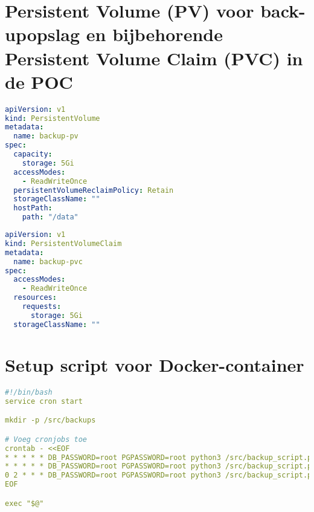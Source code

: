 \chapter{Persistent Volume (PV) voor back-upopslag en bijbehorende Persistent Volume Claim (PVC) in de POC}
\label{sec:pv}
\begin{lstlisting}[language=YAML, caption={YAML-bestand voor de configuratie van het Persistent Volume (PV) dat opslag biedt voor de databaseback-ups in Kubernetes.}]
apiVersion: v1
kind: PersistentVolume
metadata:
  name: backup-pv
spec:
  capacity:
    storage: 5Gi
  accessModes:
    - ReadWriteOnce
  persistentVolumeReclaimPolicy: Retain
  storageClassName: ""  
  hostPath:
    path: "/data"  

\end{lstlisting}

\begin{lstlisting}[language=YAML, caption={YAML-bestand voor de configuratie van de Persistent Volume Claim (PVC).}]
apiVersion: v1
kind: PersistentVolumeClaim
metadata:
  name: backup-pvc
spec:
  accessModes:
    - ReadWriteOnce
  resources:
    requests:
      storage: 5Gi
  storageClassName: ""

\end{lstlisting}
\chapter{Setup script voor Docker-container}
\label{sec:setup}
\begin{lstlisting}[language=YAML, caption={Bash-script om de cronjobs op te zetten.}]
#!/bin/bash
service cron start

mkdir -p /src/backups

# Voeg cronjobs toe
crontab - <<EOF
* * * * * DB_PASSWORD=root PGPASSWORD=root python3 /src/backup_script.py -dn testdb -du root -t MYSQL -b -bd /src/backups >> /var/log/cron.log 2>&1
* * * * * DB_PASSWORD=root PGPASSWORD=root python3 /src/backup_script.py -dn testdb -du root -t PSQL -b -bd /src/backups >> /var/log/cron.log 2>&1
0 2 * * * DB_PASSWORD=root PGPASSWORD=root python3 /src/backup_script.py -bd /src/backups -r 14 -dn testdb -du root -t MYSQL >> /var/log/cron.log 2>&1
EOF

exec "$@"
\end{lstlisting}

